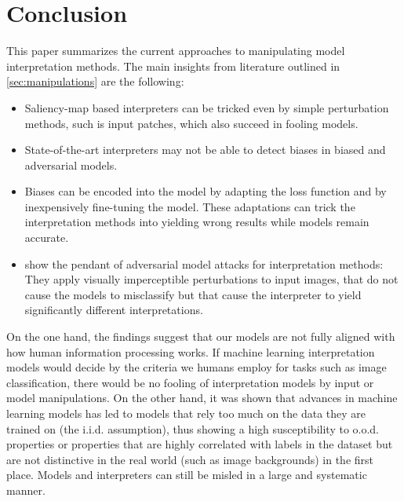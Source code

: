 \section{Conclusion}
\label{sec:discussion}

This paper summarizes the current approaches to manipulating model interpretation methods. 
The main insights from literature outlined in \autoref{sec:manipulations} are the following: 
\begin{itemize}
    \item Saliency-map based interpreters can be tricked even by simple perturbation methods, such is input patches, which also succeed in fooling models. \cite{subramanya2019fooling}
    \item State-of-the-art interpreters may not be able to detect biases in biased and adversarial models.\cite{dimanov2020you, advlime_aies20}
    \item Biases can be encoded into the model by adapting the loss function and by inexpensively fine-tuning the model. These adaptations can trick the interpretation methods into yielding wrong results while models remain accurate. \cite{fooling_nn_interpreters}
    \item \cite{dombrowski2019explanations} show the pendant of adversarial model  attacks for interpretation methods: They apply visually imperceptible perturbations to input images, that do not cause the models to misclassify but that cause the interpreter to yield significantly different interpretations.
\end{itemize}
On the one hand, the findings suggest that our models are not fully aligned with how human information processing works. If machine learning interpretation models would decide by the criteria we humans employ for tasks such as image classification, there would be no fooling of interpretation models by input or model manipulations. 
On the other hand, it was shown that advances in machine learning models has led to models that rely too much on the data they are trained on (the i.i.d. assumption), thus showing a high susceptibility to o.o.d. properties or properties that are highly correlated with labels in the dataset but are not distinctive in the real world (such as image backgrounds) in the first place. Models and interpreters can still be misled in a large and systematic manner. 

